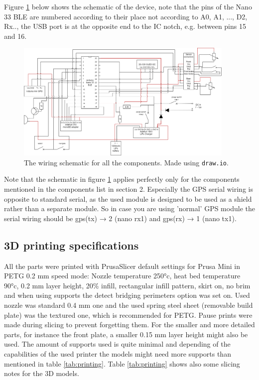 \documentclass[a4paper,11pt]{article} %
\begin{document}
Figure \ref{fig:schematic} below shows the schematic of the device, note that the pins of the Nano 33 BLE are numbered according to their place not according to A0, A1, ..., D2, Rx.., the USB port is at the opposite end to the IC notch, e.g. between pins 15 and 16.

\begin{figure}[H]
    \centering
    \includegraphics[width=105mm]{Figures/schematic.png}
    \caption{The wiring schematic for all the components. Made using \texttt{draw.io}.}
    \label{fig:schematic}
\end{figure}

Note that the schematic in figure \ref{fig:schematic} applies perfectly only for the components mentioned in the components list in section 2. Especially the GPS serial wiring is opposite to standard serial, as the used module is designed to be used as a shield rather than a separate module. So in case you are using 'normal' GPS module the serial wiring should be gps(tx) → 2 (nano rx1) and gps(rx) → 1 (nano tx1).


\subsection{3D printing specifications}

All the parts were printed with PrusaSlicer default settings for Prusa Mini in PETG 0.2 mm speed mode: Nozzle temperature 250°c, heat bed temperature 90°c, 0.2 mm layer height, 20\% infill, rectangular infill pattern, skirt on, no brim and when using supports the detect bridging perimeters option was set on. Used nozzle was standard 0.4 mm one and the used spring steel sheet (removable build plate) was the textured one, which is recommended for PETG. Pause prints were made during slicing to prevent forgetting them. For the smaller and more detailed parts, for instance the front plate, a smaller 0.15 mm layer height might also be used. The amount of supports used is quite minimal and depending of the capabilities of the used printer the models might need more supports than mentioned in table \ref{tab:printing}. Table \ref{tab:printing} shows also some slicing notes for the 3D models.
\end{document}
